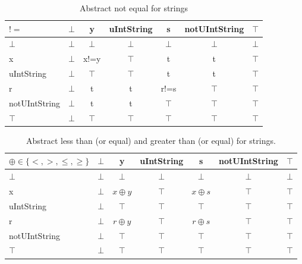 \begin{table}[htbp]
\centering
\begin{tabular}{l|cccccc}
$!=$          & $\bot$ & y      & uIntString & s      & notUIntString & $\top$ \\\hline
$\bot$        & $\bot$ & $\bot$ & $\bot$     & $\bot$ & $\bot$        & $\bot$ \\
x             & $\bot$ & x!=y   & $\top$     & t      & t             & $\top$ \\
uIntString    & $\bot$ & $\top$ & $\top$     & t      & t             & $\top$ \\
r             & $\bot$ & t      & t          & r!=s   & $\top$        & $\top$ \\
notUIntString & $\bot$ & t      & t          & $\top$ & $\top$        & $\top$ \\
$\top$        & $\bot$ & $\top$ & $\top$     & $\top$ & $\top$        & $\top$
\end{tabular}
\caption{Abstract not equal for strings}
\label{tab:abstract_not_equal_string}
\end{table}

\begin{table}[htbp]
\centering
\begin{tabular}{l|cccccc}
$\oplus\in \{<,>,\leq, \geq\}$           & $\bot$ & y      & uIntString & s      & notUIntString & $\top$ \\\hline
$\bot$        & $\bot$ & $\bot$ & $\bot$     & $\bot$ & $\bot$        & $\bot$ \\
x             & $\bot$ & $x\oplus y$ & $\top$     & $x\oplus s$    & $\top$        & $\top$ \\
uIntString    & $\bot$ & $\top$ & $\top$     & $\top$ & $\top$        & $\top$ \\
r             & $\bot$ & $r\oplus y$    & $\top$     & $r\oplus s$    & $\top$        & $\top$ \\
notUIntString & $\bot$ & $\top$ & $\top$     & $\top$ & $\top$        & $\top$ \\
$\top$        & $\bot$ & $\top$ & $\top$     & $\top$ & $\top$        & $\top$
\end{tabular}
\caption{Abstract less than (or equal) and greater than (or equal) for strings.}
\label{tab:abstract_less_than_string}
\end{table}

